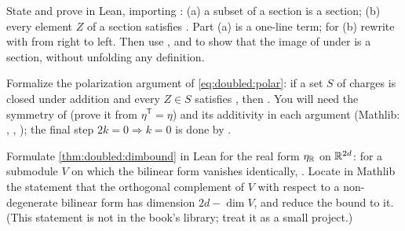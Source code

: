 \begin{exercise}
State and prove in Lean, importing : (a) a subset
of a section is a section; (b) every element $Z$ of a section satisfies
. Part (a) is a one-line term; for (b) rewrite with
 from right to left. Then use , 
and  to show that the image of  under
 is a section, without unfolding any definition.
\end{exercise}

\begin{exercise}\label{ex:doubled:leanpolar}
Formalize the polarization argument of \eqref{eq:doubled:polar}: if a set $S$ of charges is
closed under addition and every $Z\in S$ satisfies , then
. You will need the symmetry of  (prove it from
$\eta^{\mathsf T}=\eta$) and its additivity in each argument (Mathlib: ,
, ); the final step $2k=0\Rightarrow k=0$ is done
by .
\end{exercise}

\begin{exercise}\label{ex:doubled:leandim}
Formulate \cref{thm:doubled:dimbound} in Lean for the real form
$\eta_{\mathbb{R}}$ on $\mathbb{R}^{2d}$: for a submodule $V$ on which the bilinear form vanishes identically,
. Locate in Mathlib the statement that the orthogonal complement
of $V$ with respect to a non-degenerate bilinear form has dimension $2d-\dim V$, and reduce the
bound to it. (This statement is not in the book's library; treat it as a small project.)
\end{exercise}

